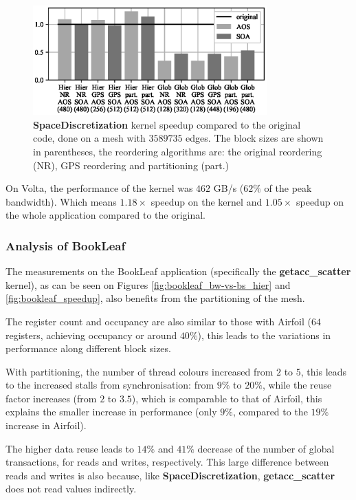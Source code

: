 \begin{figure}[Htbp]
  \centering
  \includegraphics[width=9cm]{fig/volna_speedup.eps}
  \caption{\textbf{SpaceDiscretization} kernel speedup compared to the original
  code, done on a mesh with $3589735$ edges. The block sizes are shown in
  parentheses, the reordering algorithms are: the original reordering (NR), GPS
  reordering and partitioning (part.)}
  \label{fig:volna_speedup}
\end{figure}

On Volta, the performance of the kernel was $462$ GB/s ($62\%$ of the peak
bandwidth). Which means $1.18\times$ speedup on the kernel and $1.05\times$ 
speedup on the whole application compared to the original.



\subsubsection{Analysis of BookLeaf}

The measurements on the BookLeaf application (specifically the
\textbf{getacc\_scatter} kernel), as can be seen on Figures
\ref{fig:bookleaf_bw-vs-bs_hier} and \ref{fig:bookleaf_speedup}, also benefits
from the partitioning of the mesh.

The register count and occupancy are also similar to those with Airfoil ($64$
registers, achieving occupancy or around $40\%$), this leads to the variations
in performance along different block sizes.

With partitioning, the number of thread colours increased from $2$ to $5$, this
leads to the increased stalls from synchronisation: from $9\%$ to $20\%$, while
the reuse factor increases (from $2$ to $3.5$), which is comparable to that of
Airfoil, this explains the smaller increase in performance (only $9\%$, compared
to the $19\%$ increase in Airfoil).

The higher data reuse leads to $14\%$ and $41\%$ decrease of the number of
global transactions, for reads and writes, respectively. This large difference
between reads and writes is also because, like \textbf{SpaceDiscretization},
\textbf{getacc\_scatter} does not read values indirectly.


